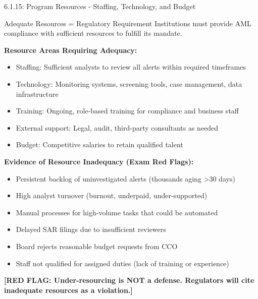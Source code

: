 \documentclass[11pt,a4paper]{beamer}
\newcommand{\redflag}[1]{\textcolor{red!80!black}{\textbf{[RED FLAG: #1]}}}
\begin{document}
\begin{frame}{6.1.15: Program Resources - Staffing, Technology, and Budget}
	\begin{block}{Adequate Resources = Regulatory Requirement}
		Institutions must provide AML compliance with sufficient resources to fulfill its mandate.
	\end{block}
	\textbf{Resource Areas Requiring Adequacy:}
	\begin{itemize}
		\item Staffing: Sufficient analysts to review all alerts within required timeframes
		\item Technology: Monitoring systems, screening tools, case management, data infrastructure
		\item Training: Ongoing, role-based training for compliance and business staff
		\item External support: Legal, audit, third-party consultants as needed
		\item Budget: Competitive salaries to retain qualified talent
	\end{itemize}
	\textbf{Evidence of Resource Inadequacy (Exam Red Flags):}
	\begin{itemize}
		\item Persistent backlog of uninvestigated alerts (thousands aging >30 days)
		\item High analyst turnover (burnout, underpaid, under-supported)
		\item Manual processes for high-volume tasks that could be automated
		\item Delayed SAR filings due to insufficient reviewers
		\item Board rejects reasonable budget requests from CCO
		\item Staff not qualified for assigned duties (lack of training or experience)
	\end{itemize}
	\redflag{Under-resourcing is NOT a defense. Regulators will cite inadequate resources as a violation.}
\end{frame}
\end{document}
